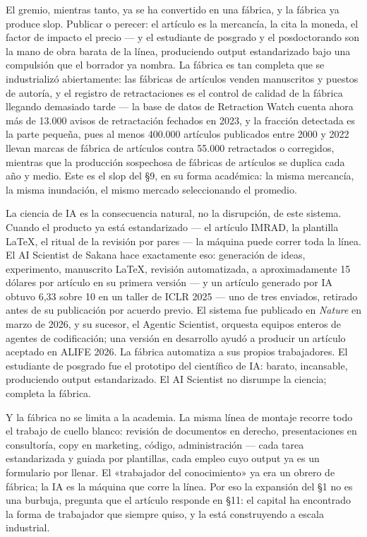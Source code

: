 \documentclass[11pt]{article}
\begin{document}
El gremio, mientras tanto, ya se ha convertido en una fábrica, y la
fábrica ya produce slop. Publicar o perecer: el artículo es la
mercancía, la cita la moneda, el factor de impacto el precio --- y el
estudiante de posgrado y el posdoctorando son la mano de obra barata de
la línea, produciendo output estandarizado bajo una compulsión que el
borrador ya nombra. La fábrica es tan completa que se industrializó
abiertamente: las fábricas de artículos venden manuscritos y puestos de
autoría, y el registro de retractaciones es el control de calidad de la
fábrica llegando demasiado tarde --- la base de datos de Retraction
Watch cuenta ahora más de 13.000 avisos de retractación fechados en
2023, y la fracción detectada es la parte pequeña, pues al menos
400.000 artículos publicados entre 2000 y 2022 llevan marcas de fábrica
de artículos contra 55.000 retractados o corregidos, mientras que la
producción sospechosa de fábricas de artículos se duplica cada año y
medio. Este es el slop del
§9, en su forma académica: la misma mercancía, la misma inundación, el
mismo mercado seleccionando el promedio.

La ciencia de IA es la consecuencia natural, no la disrupción, de este
sistema. Cuando el producto ya está estandarizado --- el artículo IMRAD,
la plantilla LaTeX, el ritual de la revisión por pares --- la máquina
puede correr toda la línea. El AI Scientist de Sakana hace exactamente
eso: generación de ideas, experimento, manuscrito LaTeX, revisión
automatizada, a aproximadamente 15 dólares por artículo en su primera
versión --- y un artículo generado por IA obtuvo 6,33 sobre 10 en un
taller de ICLR 2025 --- uno de tres enviados, retirado antes de su
publicación por acuerdo previo. El sistema fue publicado en
\textit{Nature} en marzo de 2026, y su sucesor, el Agentic Scientist,
orquesta equipos enteros de agentes de codificación; una versión en
desarrollo ayudó a producir un artículo aceptado en ALIFE 2026. La
fábrica automatiza a sus propios trabajadores. El estudiante de
posgrado fue el prototipo del científico de IA: barato, incansable,
produciendo output estandarizado. El AI Scientist no disrumpe la
ciencia; completa la fábrica.

Y la fábrica no se limita a la academia. La misma línea de montaje
recorre todo el trabajo de cuello blanco: revisión de documentos en
derecho, presentaciones en consultoría, copy en marketing, código,
administración --- cada tarea estandarizada y guiada por plantillas,
cada empleo cuyo output ya es un formulario por llenar. El «trabajador
del conocimiento» ya era un obrero de fábrica; la IA es la máquina que
corre la línea. Por eso la expansión del §1 no es una burbuja, pregunta
que el artículo responde en §11: el capital ha encontrado la forma de
trabajador que siempre quiso, y la está construyendo a escala
industrial.
\end{document}
